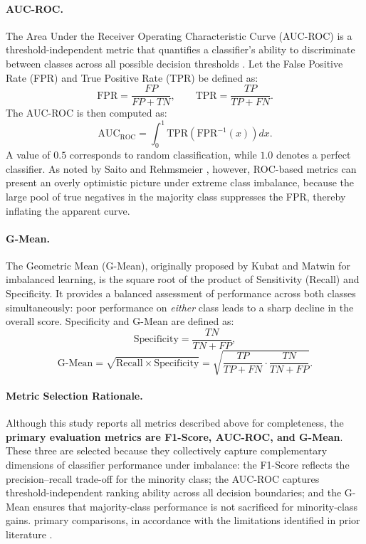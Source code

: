 \documentclass[sigconf]{acmart}
\begin{document}
\paragraph{AUC-ROC.}
The Area Under the Receiver Operating Characteristic Curve (AUC-ROC) is a
threshold-independent metric that quantifies a classifier's ability to
discriminate between classes across all possible decision
thresholds \cite{6}.
Let the False Positive Rate (FPR) and True Positive Rate (TPR) be defined
as:
%
\begin{equation}
  \mathrm{FPR} = \frac{FP}{FP + TN},
  \qquad
  \mathrm{TPR} = \frac{TP}{TP + FN}.
  \label{eq:fpr_tpr}
\end{equation}
%
The AUC-ROC is then computed as:
%
\begin{equation}
  \mathrm{AUC}_{\mathrm{ROC}}
    = \int_{0}^{1} \mathrm{TPR}\!\left(\mathrm{FPR}^{-1}(x)\right) dx.
  \label{eq:aucroc}
\end{equation}
%
A value of $0.5$ corresponds to random classification, while $1.0$ denotes
a perfect classifier.
As noted by Saito and Rehmsmeier \cite{36}, however,
ROC-based metrics can present an overly optimistic picture under extreme
class imbalance, because the large pool of true negatives in the majority
class suppresses the FPR, thereby inflating the apparent curve.

\paragraph{G-Mean.}
The Geometric Mean (G-Mean), originally proposed by Kubat and
Matwin \cite{7} for imbalanced learning, is the square
root of the product of Sensitivity (Recall) and Specificity.
It provides a balanced assessment of performance across both classes
simultaneously: poor performance on \emph{either} class leads to a sharp
decline in the overall score.
Specificity and G-Mean are defined as:
%
\begin{equation}
  \mathrm{Specificity} = \frac{TN}{TN + FP},
  \label{eq:specificity}
\end{equation}
%
\begin{equation}
  \mathrm{G\text{-}Mean}
    = \sqrt{\mathrm{Recall} \times \mathrm{Specificity}}
    = \sqrt{\frac{TP}{TP + FN} \cdot \frac{TN}{TN + FP}}.
  \label{eq:gmean}
\end{equation}

\paragraph{Metric Selection Rationale.}
Although this study reports all metrics described above for completeness,
the \textbf{primary evaluation metrics are F1-Score, AUC-ROC, and G-Mean}.
These three are selected because they collectively capture complementary
dimensions of classifier performance under imbalance: the F1-Score reflects
the precision--recall trade-off for the minority class; the AUC-ROC captures
threshold-independent ranking ability across all decision boundaries; and
the G-Mean ensures that majority-class performance is not sacrificed for
minority-class gains.
primary comparisons, in accordance with the limitations identified in prior literature \cite{1, 5, 36}.
\end{document}
